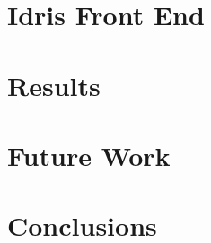 \documentclass[runningheads]{llncs}
\begin{document}
	\section{Idris Front End} \label{sec:idris-front-end}
	
	
	\section{Results}
	
	
	\section{Future Work}
	
	
	\section{Conclusions}
	
		
	\newpage
	

	
\end{document}
